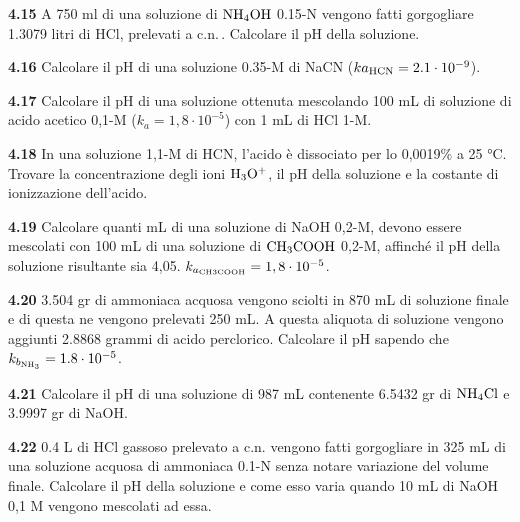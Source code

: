 \vspace{0.2cm}\textbf{4.15} A 750 ml di una soluzione di $\rm NH_4OH$ 0.15-N vengono fatti gorgogliare 1.3079 litri di HCl, prelevati a c.n.\,. Calcolare il pH della soluzione.

\vspace{0.2cm}\textbf{4.16} Calcolare il pH di una soluzione 0.35-M di NaCN ($k{a_{\rm HCN}} = 2.1 \cdot 10^{-9}$).

\vspace{0.2cm}\textbf{4.17} Calcolare il pH di una soluzione ottenuta mescolando 100 mL di soluzione di acido acetico 0,1-M ($k_a = 1,8 \cdot 10^{-5}$) con 1 mL di HCl 1-M.

\vspace{0.2cm}\textbf{4.18}  In una soluzione 1,1-M di HCN, l’acido è dissociato per lo 0,0019\% a 25 °C. Trovare la concentrazione degli ioni $\rm H_3O^+$, il pH della soluzione e la costante di ionizzazione dell’acido. 

\vspace{0.2cm}\textbf{4.19}  Calcolare quanti mL di una soluzione di NaOH 0,2-M, devono essere mescolati con
100 mL di una soluzione di $\rm CH_3COOH$ 0,2-M, affinché il pH della soluzione risultante sia 4,05. $k_{a_{\rm CH3COOH}}= 1,8 \cdot 10^{-5}$.

\vspace{0.2cm}\textbf{4.20} 3.504 gr di ammoniaca acquosa vengono sciolti in 870 mL di soluzione finale e di questa ne vengono prelevati 250 mL. A questa aliquota di soluzione vengono aggiunti 2.8868 grammi di acido perclorico. Calcolare il pH sapendo che $k_{b_{\rm NH_3}}=1.8 \cdot 10^{-5}$.

\vspace{0.2cm}\textbf{4.21} Calcolare il pH di una soluzione di 987 mL contenente 6.5432 gr di $\rm NH_4Cl$ e 3.9997 gr di NaOH.

\vspace{0.2cm}\textbf{4.22} 0.4 L di HCl gassoso prelevato a c.n. vengono fatti gorgogliare in 325 mL di una soluzione acquosa di ammoniaca 0.1-N senza notare variazione del volume finale. Calcolare il pH della soluzione e come esso varia quando 10 mL di NaOH 0,1 M vengono mescolati ad essa.